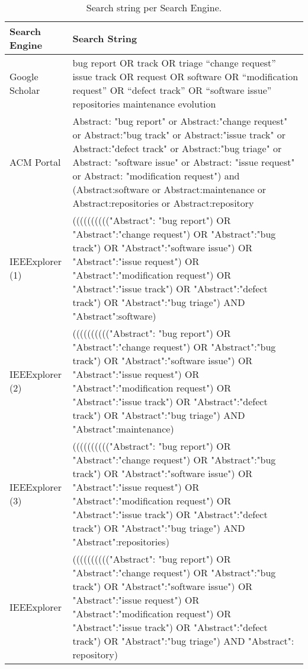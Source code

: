 \begin{table}[h]
\centering
\footnotesize
\caption{Search string per Search Engine.}
\label{tbl:stringengine}
\begin{tabular}{p{}p{}}
\toprule
\textbf{Search Engine} & \textbf{Search String}\\
\toprule
   	 	Google Scholar &  bug report OR track OR triage ``change
   	 	request'' issue track OR request OR software OR ``modification request'' OR
   	 	``defect track'' OR ``software issue''  repositories maintenance evolution\\

   	 	ACM Portal & Abstract: "bug report" or Abstract:"change request"
   	 	or Abstract:"bug track" or Abstract:"issue track" or  Abstract:"defect
   	 	track" or Abstract:"bug triage" or Abstract: "software issue" or Abstract: "issue request"
   	 	or Abstract: "modification request") and  (Abstract:software or
   	 	Abstract:maintenance or Abstract:repositories or Abstract:repository \\

   	 	IEEExplorer (1) & (((((((((("Abstract": "bug report") OR
   	 	"Abstract":"change request") OR "Abstract":"bug track") OR "Abstract":"software issue") OR "Abstract":"issue request") OR
        "Abstract":"modification request") OR "Abstract":"issue track") OR
	    "Abstract":"defect track") OR "Abstract":"bug triage") AND
	    "Abstract":software)\\

         IEEExplorer (2) & (((((((((("Abstract": "bug report") OR
         "Abstract":"change request") OR "Abstract":"bug track") OR "Abstract":"software issue") OR
         "Abstract":"issue request") OR "Abstract":"modification request") OR
         "Abstract":"issue track") OR "Abstract":"defect track") OR
         "Abstract":"bug triage") AND "Abstract":maintenance)\\

         IEEExplorer (3) & (((((((((("Abstract": "bug report") OR
         "Abstract":"change request") OR "Abstract":"bug track") OR "Abstract":"software issue") OR
         "Abstract":"issue request") OR "Abstract":"modification request") OR
         "Abstract":"issue track") OR "Abstract":"defect track") OR
         "Abstract":"bug triage") AND "Abstract":repositories)\\

         IEEExplorer & (((((((((("Abstract": "bug report") OR
         "Abstract":"change request") OR "Abstract":"bug track") OR "Abstract":"software issue") OR
         "Abstract":"issue request") OR "Abstract":"modification request") OR
         "Abstract":"issue track") OR "Abstract":"defect track") OR
         "Abstract":"bug triage") AND "Abstract": repository)\\


\end{tabular}
\end{table}
